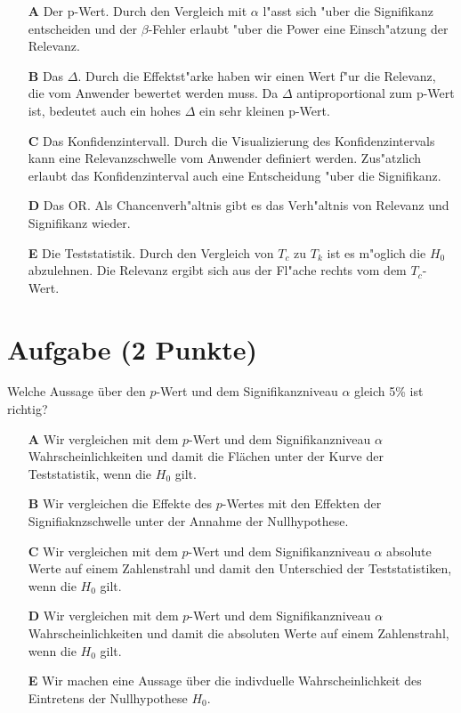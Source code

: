 \documentclass[a4paper, 10pt]{scrartcl}\usepackage[]{graphicx}\usepackage[]{xcolor}
\begin{document}
\begin{enumerate}
\item [\textbf{A} \msquare] Der p-Wert. Durch den Vergleich mit $\alpha$ l{"a}sst sich {"u}ber die Signifikanz entscheiden und der $\beta$-Fehler erlaubt {"u}ber die Power eine Einsch{"a}tzung der Relevanz.
\item [\textbf{B} \msquare] Das $\Delta$. Durch die Effektst{"a}rke haben wir einen Wert f{"u}r die Relevanz, die vom Anwender bewertet werden muss. Da $\Delta$ antiproportional zum p-Wert ist, bedeutet auch ein hohes $\Delta$ ein sehr kleinen p-Wert.
\item [\textbf{C} \msquare] Das Konfidenzintervall. Durch die Visualizierung des Konfidenzintervals kann eine Relevanzschwelle vom Anwender definiert werden. Zus{"a}tzlich erlaubt das Konfidenzinterval auch eine Entscheidung {"u}ber die Signifikanz.
\item [\textbf{D} \msquare] Das OR. Als Chancenverh{"a}ltnis gibt es das Verh{"a}ltnis von Relevanz und Signifikanz wieder.
\item [\textbf{E} \msquare] Die Teststatistik. Durch den Vergleich von $T_c$ zu $T_k$ ist es m{"o}glich die $H_0$ abzulehnen. Die Relevanz ergibt sich aus der Fl{"a}che rechts vom dem $T_c$-Wert.
\end{enumerate}

\section{Aufgabe \hfill (2 Punkte)}

Welche Aussage über den $p$-Wert und dem Signifikanzniveau $\alpha$ gleich 5\% ist richtig?



\begin{enumerate}
\item [\textbf{A} \msquare] Wir vergleichen mit dem $p$-Wert und dem Signifikanzniveau $\alpha$ Wahrscheinlichkeiten und damit die Flächen unter der Kurve der Teststatistik, wenn die $H_0$ gilt.
\item [\textbf{B} \msquare] Wir vergleichen die Effekte des $p$-Wertes mit den Effekten der Signifiaknzschwelle unter der Annahme der Nullhypothese.
\item [\textbf{C} \msquare] Wir vergleichen mit dem $p$-Wert und dem Signifikanzniveau $\alpha$ absolute Werte auf einem Zahlenstrahl und damit den Unterschied der Teststatistiken, wenn die $H_0$ gilt.
\item [\textbf{D} \msquare] Wir vergleichen mit dem $p$-Wert und dem Signifikanzniveau $\alpha$ Wahrscheinlichkeiten und damit die absoluten Werte auf einem Zahlenstrahl, wenn die $H_0$ gilt.
\item [\textbf{E} \msquare] Wir machen eine Aussage über die indivduelle Wahrscheinlichkeit des Eintretens der Nullhypothese $H_0$.
\end{enumerate}
\end{document}
